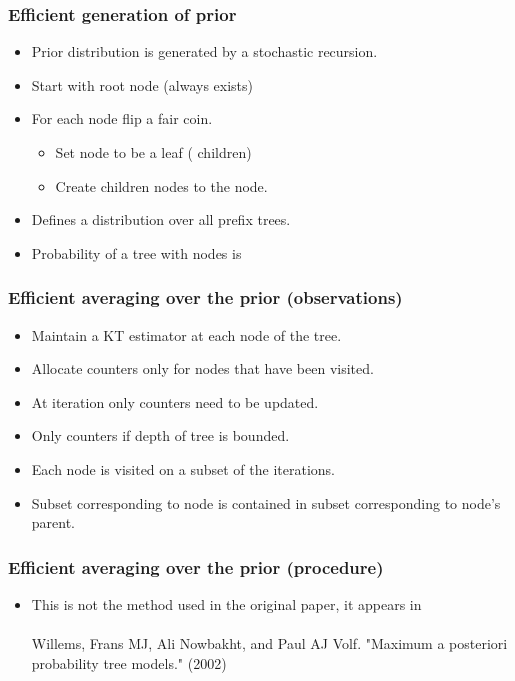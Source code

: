 \documentclass{beamer}
\begin{document}
\begin{frame}
\frametitle{Efficient generation of prior}
\begin{itemize}
\item Prior distribution is generated by a stochastic recursion.
\item Start with root node (always exists)
\item For each node flip a fair coin.
\begin{itemize}
\item {} Set node to be a leaf ( children)
\item {} Create  children nodes to the node.
\end{itemize}
\item Defines a distribution over all prefix trees.
\item Probability of a tree with  nodes is 
\end{itemize}
\end{frame}

\begin{frame}
\frametitle{Efficient averaging over the prior (observations)}
\begin{itemize}
\item Maintain a KT estimator at each node of the tree.
\item Allocate counters only for nodes that have been visited.
\item At iteration  only  counters need to be updated.
\item Only  counters if depth of tree is bounded.
\item Each node is visited on a subset of the iterations.
\item Subset corresponding to node is contained in subset corresponding to node's parent.
\end{itemize}
\end{frame}

\begin{frame}
\frametitle{Efficient averaging over the prior (procedure)}
\begin{itemize}
\item This is not the method used in the original paper, it appears in\\
  ~\\
  Willems, Frans MJ, Ali Nowbakht, and Paul AJ Volf. "Maximum a posteriori probability tree models." (2002)

\end{itemize}
\end{frame}
\end{document}
